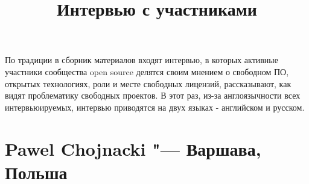 \documentclass[10pt, a5paper]{article}
\begin{document}
\title{Интервью с участниками}
\date{}
\maketitle

По традиции в сборник материалов входят интервью, в которых активные участники
сообщества open source делятся своим мнением о свободном ПО, открытых
технологиях, роли и месте свободных лицензий, рассказывают, как видят проблематику
свободных проектов. В этот раз, из-за англоязычности всех интервьюируемых, интервью приводятся на двух языках - английском и русском.

\section{Pawel Chojnacki "---  Варшава, Польша}
\end{document}
